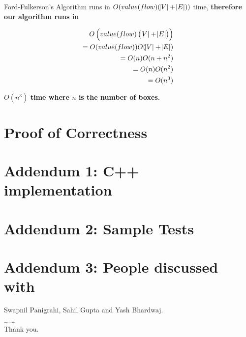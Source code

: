 \documentclass{article}
\begin{document}
Ford-Fulkerson's Algorithm runs in $O(value(flow)(\abs{V} + \abs{E}))$ time, \textbf{therefore our algorithm runs in}

    \begin{center}
    \begin{align*}
        O\left(value(flow)\left( \abs{V} + \abs{E} \right) \right) \\
        = O(value(flow)) O(\abs{V} + \abs{E}) \\
        = O(n) O(n + n^2) \\
        = O(n) O(n^2) \\
        = O(n^3) 
    \end{align*}
    \end{center}

$O(n^3)$ \textbf{time where $n$ is the number of boxes.}


\section{Proof of Correctness}


\section*{Addendum 1: C++ implementation}


\section*{Addendum 2: Sample Tests}

% 
% 

\section*{Addendum 3: People discussed with}

Swapnil Panigrahi, Sahil Gupta and Yash Bhardwaj.

\vspace*{\fill}
\begin{center}
    $\square \square \square \square \square$
    \\
    Thank you.
\end{center}
\vspace*{\fill}
\end{document}
